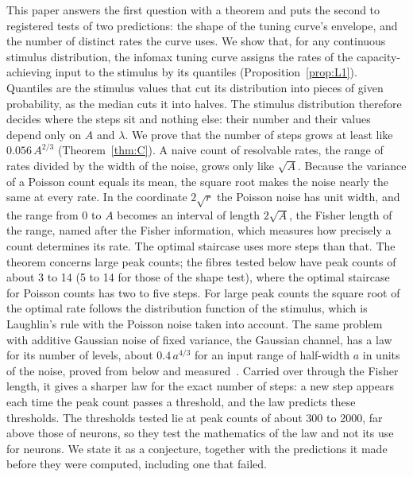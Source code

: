 \documentclass[10pt,letterpaper]{article}
\begin{document}
This paper answers the first question with a theorem and puts the second to registered tests of two predictions: the shape of the
tuning curve's envelope, and the number of distinct rates the curve uses. We show that, for any continuous
stimulus distribution, the infomax tuning curve assigns the rates of the capacity-achieving input to the stimulus by its quantiles
(Proposition~\ref{prop:L1}). Quantiles are the stimulus values that cut its distribution into pieces of given probability, as the
median cuts it into halves. The stimulus distribution therefore decides where the steps sit and nothing else: their number and their
values depend only on $A$ and $\lambda$. We prove that the number of steps grows at least like $0.056\,A^{2/3}$
(Theorem~\ref{thm:C}). A naive count of resolvable rates, the range of rates divided by the width of the noise, grows only like
$\sqrt A$. Because the variance of a Poisson count equals its mean, the square root makes the noise nearly the same at every rate. In
the coordinate $2\sqrt{r}$ the Poisson noise has unit width, and the range from $0$ to $A$ becomes an interval of length $2\sqrt A$,
the Fisher length of the range, named after the Fisher information, which measures how precisely a count determines its rate. The optimal staircase uses more steps than that. The theorem concerns large peak counts; the fibres
tested below have peak counts of about 3 to 14 (5 to 14 for those of the shape test), where the optimal staircase for Poisson
counts has two to five steps. For large peak
counts the square root of the optimal rate follows the distribution function of the stimulus, which is Laughlin's rule with the
Poisson noise taken into account. The same problem with additive
Gaussian noise of fixed variance, the Gaussian channel, has a law for its number of levels, about $0.4\,a^{4/3}$ for an input range
of half-width $a$ in units of the noise, proved from below and measured~\cite{Paper1}. Carried over through the Fisher length, it gives
a sharper law for the exact number of steps: a new step appears each time the peak count passes a threshold, and the law predicts
these thresholds. The thresholds tested lie at peak counts of about 300 to 2000, far above those of neurons, so they test the
mathematics of the law and not its use for neurons. We state it as a conjecture, together with the
predictions it made before they were computed, including one that failed.
\end{document}
